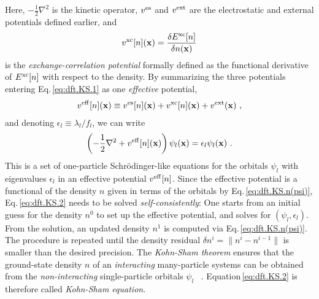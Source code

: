 Here, $-\frac{1}{2} \nabla^2$ is the kinetic operator, $v^{\rm es}$ and $v^{\rm ext}$ are the electrostatic and external potentials defined earlier, and
\begin{align}
	v^{\rm xc} [n] ({\bf x})
		= \frac{\delta E^{\rm xc}[n]}{\delta n ({\bf x})}
	\label{eq:dft.vxc}
\end{align}
is the \emph{exchange-correlation potential} formally defined as the functional derivative of $E^{\rm xc} [n]$ with respect to the density. By summarizing the three potentials entering Eq.\,\eqref{eq:dft.KS.1} as one \emph{effective} potential,
\begin{align}
	v^{\rm eff} [n] ({\bf x})
	\equiv
		v^{\rm es} [n] ({\bf x})
		+ v^{\rm xc} [n] ({\bf x})
		+ v^{\rm ext}  ({\bf x})~,
	\label{eq:dft.KS.veff}
\end{align}
 and denoting $\epsilon_l \equiv \lambda_l / f_l$, we can write
\begin{align}
	\left(
		-\frac{1}{2} \nabla^2 
		+ v^{\rm eff} [n] ({\bf x})
	\right) \psi_l ({\bf x})
	= \epsilon_l \psi_l ({\bf x})~.
\label{eq:dft.KS.2}
\end{align}
This is a set of one-particle Schr\"odinger-like equations for the orbitals $\psi_l$ with eigenvalues $\epsilon_l$ in an effective potential $v^{\rm eff}[n]$. Since the effective potential is a functional of the density $n$ given in terms of the orbitals by Eq.\,\eqref{eq:dft.KS.n(psi)}, Eq.\,\eqref{eq:dft.KS.2} needs to be solved \emph{self-consistently}: One starts from an initial guess for the density $n^0$ to set up the effective potential, and solves for $(\psi_l, \epsilon_l)$. From the solution, an updated density $n^1$ is computed via Eq.\,\eqref{eq:dft.KS.n(psi)}. The procedure is repeated until the density residual $\delta n^i = \lVert n^i - n^{i-1} \rVert$ is smaller than the desired precision. The \emph{Kohn-Sham theorem} ensures that the ground-state density $n$ of an \emph{interacting} many-particle systems can be obtained from the \emph{non-interacting} single-particle orbitals $\psi_l$~\cite[p.\,51]{Kohn1965} . Equation\,\eqref{eq:dft.KS.2} is therefore called \emph{Kohn-Sham equation}.

